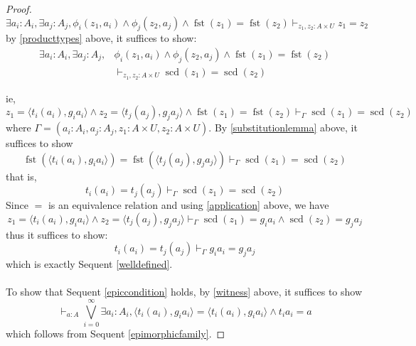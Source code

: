 \documentclass{birkjour}
\theoremstyle{plain}
\theoremstyle{definition}
\begin{document}
\begin{proof}
	\begin{equation}
		\label{firstreduction}
		\exists a_i: A_i, \exists a_j: A_j, \phi_i(z_1,a_i) \wedge \phi_j(z_2, a_j) \wedge \operatorname{fst}(z_1) = \operatorname{fst}(z_2) \vdash_{z_1,z_2: A \times U} z_1 = z_2
	\end{equation}
	by \ref{producttypes} above, it suffices to show:
	\begin{align*}
		\exists a_i: A_i, \exists a_j: A_j, &\phi_i(z_1,a_i) \wedge \phi_j(z_2, a_j) \wedge \operatorname{fst}(z_1) = \operatorname{fst}(z_2) \\
		&\vdash_{z_1,z_2: A \times U} \operatorname{scd}(z_1) = \operatorname{scd}(z_2)
	\end{align*}
	
	
	
	ie,
	\[z_1 = \langle t_i(a_i),g_ia_i\rangle \wedge z_2 = \langle t_j(a_j),g_ja_j\rangle \wedge \operatorname{fst}(z_1) = \operatorname{fst}(z_2) \vdash_\Gamma \operatorname{scd}(z_1) = \operatorname{scd}(z_2)\]
	where $\Gamma = (a_i: A_i, a_j: A_j, z_1 : A \times U, z_2: A \times U)$. By \ref{substitutionlemma} above, it suffices to show
	\[\operatorname{fst}(\langle t_i(a_i),g_ia_i\rangle) = \operatorname{fst}(\langle t_j(a_j), g_ja_j\rangle) \vdash_\Gamma \operatorname{scd}(z_1) = \operatorname{scd}(z_2)\]
	that is,
	\[t_i(a_i) = t_j(a_j) \vdash_\Gamma \operatorname{scd}(z_1) = \operatorname{scd}(z_2)\]
	Since $=$ is an equivalence relation \cite[\S 4.1 Definition 1.3.1b]{Johnstone} and using \ref{application} above, we have
	\[z_1 = \langle t_i(a_i),g_ia_i\rangle \wedge z_2 = \langle t_j(a_j),g_ja_j\rangle \vdash_\Gamma \operatorname{scd}(z_1) = g_ia_i \wedge \operatorname{scd}(z_2) = g_ja_j\]
	thus it suffices to show:
	\[t_i(a_i) = t_j(a_j) \vdash_\Gamma g_ia_i = g_ja_j\]
	which is exactly Sequent \ref{welldefined}.\\\\
	To show that Sequent \ref{epiccondition} holds, by \ref{witness} above, it suffices to show
	\[\vdash_{a:A}\bigvee_{i = 0}^\infty \exists a_i: A_i, \langle t_i(a_i),g_ia_i\rangle = \langle t_i(a_i), g_ia_i\rangle \wedge t_ia_i = a\]
	which follows from Sequent \ref{epimorphicfamily}.
\end{proof}
\end{document}
